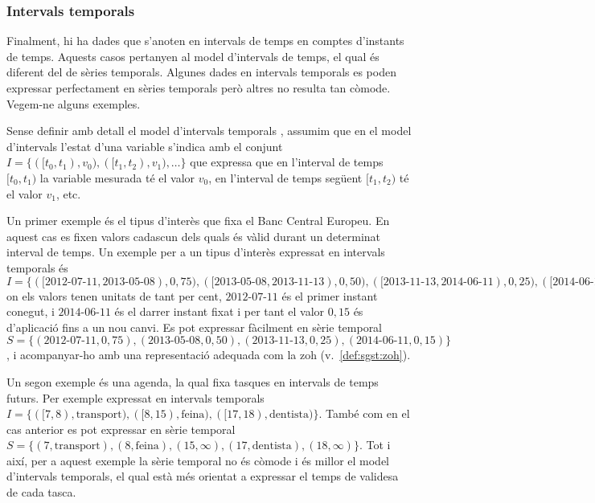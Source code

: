 \subsubsection{Intervals temporals}


Finalment, hi ha dades que s'anoten en intervals de temps en comptes
d'instants de temps. Aquests casos pertanyen al model d'intervals de
temps, el qual és diferent del de sèries temporals. Algunes dades en
intervals temporals es poden expressar perfectament en sèries
temporals però altres no resulta tan còmode. Vegem-ne alguns exemples.


Sense definir amb detall el model d'intervals
temporals \parencite{date02:_tempor_data_relat_model}, assumim que en
el model d'intervals l'estat d'una variable s'indica amb el conjunt
$I=\{([t_0,t_1),v_0),([t_1,t_2),v_1),\dotsc\}$ que expressa que en
l'interval de temps $[t_0,t_1)$ la variable mesurada té el valor
$v_0$, en l'interval de temps següent $[t_1,t_2)$ té el valor $v_1$,
etc.






\begin{example}
  \label{ex:sgst:bce}
  Un primer exemple és el tipus d'interès que fixa el Banc Central
  Europeu. En aquest cas es fixen valors cadascun dels quals és vàlid
  durant un determinat interval de temps.  Un exemple per a un tipus
  d'interès expressat en intervals temporals és
  $I=\{([\text{2012-07-11},\text{2013-05-08}),
  0{,}75),([\text{2013-05-08},\text{2013-11-13}),
  0{,}50),([\text{2013-11-13},\text{2014-06-11}),
  0{,}25),([\text{2014-06-11},+\infty), 0{,}15) \}$ on els valors
  tenen unitats de tant per cent, $\text{2012-07-11}$ és el primer
  instant conegut, i $\text{2014-06-11}$ és el darrer instant fixat i
  per tant el valor $0{,}15$ és d'aplicació fins a un nou canvi. Es
  pot expressar fàcilment en sèrie temporal $S=\{(\text{2012-07-11},
  0{,}75),(\text{2013-05-08},0{,}50),(\text{2013-11-13},0{,}25),(\text{2014-06-11},0{,}15)\}$,
  i acompanyar-ho amb una representació adequada com la \gls{zoh}
  (v.~\autoref{def:sgst:zoh}).
\end{example}


\begin{example}
Un segon exemple és una agenda, la qual fixa tasques en intervals de
temps futurs. Per exemple expressat en intervals temporals
$I=\{([7,8),\text{transport}),([8,15),\text{feina}),([17,18),
\text{dentista})\}$. També com en el cas anterior es pot expressar en
sèrie temporal $S=\{(7,\text{transport}),(8,\text{feina}), (15,\infty)
,(17,\text{dentista}), (18,\infty)\}$. Tot i així, per a aquest
exemple la sèrie temporal no és còmode i és millor el model
d'intervals temporals, el qual està més orientat a expressar
el temps de validesa de cada tasca.
\end{example}



